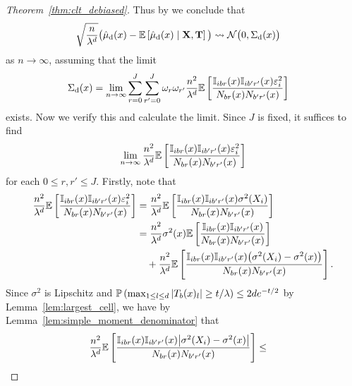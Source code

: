 \begin{proof}[Theorem~\ref{thm:clt_debiased}]
  Thus by \citet[Theorem~3.2]{hall2014martingale}
  we conclude that
  \begin{align*}
    \sqrt{\frac{n}{\lambda^d}}
    \big(
      \hat\mu_\rd(x)
      - \E\left[
        \hat\mu_\rd(x) \mid \bX, \bT
      \right]
    \big)
    &\rightsquigarrow
    \cN\big(0, \Sigma_\rd(x)\big)
  \end{align*}
  as $n \to \infty$, assuming that the limit
  \begin{align*}
    \Sigma_\rd(x)
    &=
    \lim_{n \to \infty}
    \sum_{r=0}^{J}
    \sum_{r'=0}^{J}
    \omega_r
    \omega_{r'}
    \frac{n^2}{\lambda^d}
    \E \left[
      \frac{\I_{i b r}(x) \I_{i b' r'}(x) \varepsilon_i^2}
      {N_{b r}(x) N_{b' r'}(x)}
    \right]
  \end{align*}
  exists. Now we verify this and calculate the limit.
  Since $J$ is fixed, it suffices to find
  \begin{align*}
    \lim_{n \to \infty}
    \frac{n^2}{\lambda^d}
    \E \left[
      \frac{\I_{i b r}(x) \I_{i b' r'}(x) \varepsilon_i^2}
      {N_{b r}(x) N_{b' r'}(x)}
    \right]
  \end{align*}
  for each $0 \leq r, r' \leq J$.
  Firstly, note that
  \begin{align*}
    \frac{n^2}{\lambda^d}
    \E \left[
      \frac{\I_{i b r}(x) \I_{i b' r'}(x) \varepsilon_i^2}
      {N_{b r}(x) N_{b' r'}(x)}
    \right]
    &=
    \frac{n^2}{\lambda^d}
    \E \left[
      \frac{\I_{i b r}(x) \I_{i b' r'}(x) \sigma^2(X_i)}
      {N_{b r}(x) N_{b' r'}(x)}
    \right] \\
    &=
    \frac{n^2}{\lambda^d}
    \sigma^2(x)
    \E \left[
      \frac{\I_{i b r}(x) \I_{i b' r'}(x)}
      {N_{b r}(x) N_{b' r'}(x)}
    \right] \\
    &\quad+
    \frac{n^2}{\lambda^d}
    \E \left[
      \frac{\I_{i b r}(x) \I_{i b' r'}(x)
      \big(\sigma^2(X_i) - \sigma^2(x) \big)}
      {N_{b r}(x) N_{b' r'}(x)}
    \right].
  \end{align*}
  Since $\sigma^2$ is Lipschitz and
  $\P \left(\max_{1 \leq l \leq d}
  |T_b(x)_l| \geq t/\lambda \right) \leq 2d e^{-t/2}$
  by Lemma~\ref{lem:largest_cell},
  we have by Lemma~\ref{lem:simple_moment_denominator} that
  \begin{align*}
    \frac{n^2}{\lambda^d}
    \E \left[
      \frac{\I_{i b r}(x) \I_{i b' r'}(x)
      \big|\sigma^2(X_i) - \sigma^2(x) \big|}
      {N_{b r}(x) N_{b' r'}(x)}
    \right]
    &\leq

\end{align*}
\end{proof}
